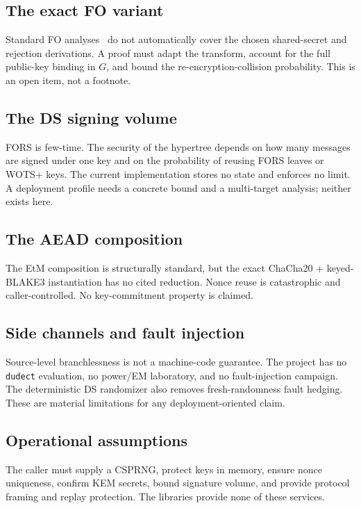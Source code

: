 \documentclass[11pt,a4paper]{article}
\theoremstyle{plain}
\theoremstyle{definition}
\theoremstyle{remark}
\begin{document}
\subsection{The exact FO variant}

Standard FO analyses~\cite{fo99,hhk17} do not automatically cover the
chosen shared-secret and rejection derivations.  A proof must adapt the
transform, account for the full public-key binding in $G$, and bound
the re-encryption-collision probability.  This is an open item, not a
footnote.

\subsection{The DS signing volume}

FORS is few-time.  The security of the hypertree depends on how many
messages are signed under one key and on the probability of reusing
FORS leaves or WOTS+ keys.  The current implementation stores no state
and enforces no limit.  A deployment profile needs a concrete bound and
a multi-target analysis; neither exists here.

\subsection{The AEAD composition}

The EtM composition is structurally standard, but the exact
ChaCha20 + keyed-BLAKE3 instantiation has no cited reduction.  Nonce
reuse is catastrophic and caller-controlled.  No key-commitment property
is claimed.

\subsection{Side channels and fault injection}

Source-level branchlessness is not a machine-code guarantee.  The
project has no \texttt{dudect} evaluation, no power/EM laboratory, and
no fault-injection campaign.  The deterministic DS randomizer also
removes fresh-randomness fault hedging.  These are material limitations
for any deployment-oriented claim.

\subsection{Operational assumptions}

The caller must supply a CSPRNG, protect keys in memory, ensure nonce
uniqueness, confirm KEM secrets, bound signature volume, and provide
protocol framing and replay protection.  The libraries provide none of
these services.
\end{document}
